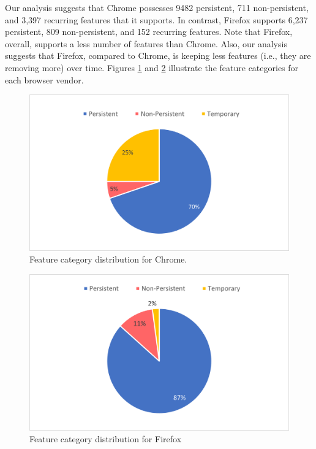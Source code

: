 Our analysis suggests that Chrome possesses 9482 persistent, 711
non-persistent, and 3,397 recurring features that it supports. In
contrast, Firefox supports 6,237 persistent, 809 non-persistent, and
152 recurring features. Note that Firefox, overall, supports a less
number of features than Chrome. Also, our analysis suggests that Firefox,
compared to Chrome, is keeping less features (i.e., they are removing
more) over time. Figures \ref{fig:chrome-categories} and
\ref{fig:firefox-categories} illustrate the feature categories for
each browser vendor.

\begin{figure}[ht]
    \centering
    \includegraphics[width=\columnwidth]{figures/chrome-feature-categories.png}
    \caption{Feature category distribution for Chrome.}
    \label{fig:chrome-categories}
\end{figure}

\begin{figure}[ht]
    \centering
    \includegraphics[width=\columnwidth]{figures/firefox-feature-categories.png}
    \caption{Feature category distribution for Firefox}
    \label{fig:firefox-categories}
  \end{figure}

